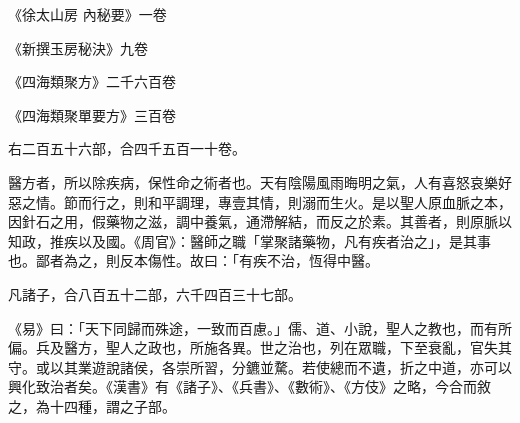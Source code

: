 \begin{pinyinscope}
 《徐太山房
 內秘要》一卷



 《新撰玉房秘決》九卷



 《四海類聚方》二千六百卷



 《四海類聚單要方》三百卷



 右二百五十六部，合四千五百一十卷。



 醫方者，所以除疾病，保性命之術者也。天有陰陽風雨晦明之氣，人有喜怒哀樂好惡之情。節而行之，則和平調理，專壹其情，則溺而生火。是以聖人原血脈之本，因針石之用，假藥物之滋，調中養氣，通滯解結，而反之於素。其善者，則原脈以知政，推疾以及國。《周官》：醫師之職「掌聚諸藥物，凡有疾者治之」，是其事也。鄙者為之，則反本傷性。故曰：「有疾不治，恆得中醫。



 凡諸子，合八百五十二部，六千四百三十七部。



 《易》曰：「天下同歸而殊途，一致而百慮。」儒、道、小說，聖人之教也，而有所偏。兵及醫方，聖人之政也，所施各異。世之治也，列在眾職，下至衰亂，官失其守。或以其業遊說諸侯，各崇所習，分鑣並騖。若使總而不遺，折之中道，亦可以興化致治者矣。《漢書》有《諸子》、《兵書》、《數術》、《方伎》之略，今合而敘之，為十四種，謂之子部。



\end{pinyinscope}